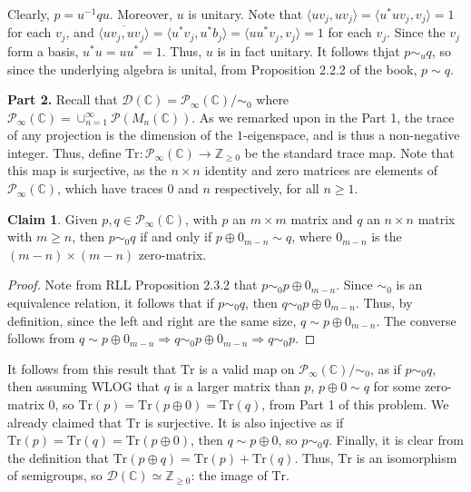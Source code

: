 \documentclass[aps,pra,showpacs,notitlepage,onecolumn,superscriptaddress,nofootinbib]{revtex4-1}
\theoremstyle{definition}
\newtheorem{claim}{Claim}[section]
\begin{document}
Clearly, $p = u^{-1} q u$. Moreover, $u$ is unitary. Note that $\langle u v_j, u v_j \rangle = \langle u^{*} u v_j, v_j \rangle = 1$ for each $v_j$, and $\overline{\langle u v_j, u v_j \rangle} = \langle u^{*} v_j, u^{*} b_j \rangle = \langle u u^{*} v_j, v_j \rangle = 1$
for each $v_j$. Since the $v_j$ form a basis, $u^{*} u = u u^{*} = 1$. Thus, $u$ is in fact unitary. It follows thjat $p \sim_{u} q$, so since the underlying algebra is unital, from Proposition 2.2.2 of the book, $p \sim q$.
\newline

\noindent \textbf{Part 2.} Recall that $\mathcal{D}(\mathbb{C}) = \mathcal{P}_{\infty}(\mathbb{C}) / \sim_0$ where $\mathcal{P}_{\infty}(\mathbb{C}) = \cup_{n = 1}^{\infty} \mathcal{P}(M_n(\mathbb{C}))$.
As we remarked upon in the Part 1, the trace of any projection is the dimension of the $1$-eigenspace, and is thus a non-negative integer. Thus, define $\text{Tr} : \mathcal{P}_{\infty}(\mathbb{C}) \rightarrow \mathbb{Z}_{\geq 0}$
be the standard trace map. Note that this map is surjective, as the $n \times n$ identity and zero matrices are elements of $\mathcal{P}_{\infty}(\mathbb{C})$, which have traces $0$ and $n$ respectively, for all $n \geq 1$.

\begin{claim}
  Given $p, q \in \mathcal{P}_{\infty}(\mathbb{C})$, with $p$ an $m \times m$ matrix and $q$ an $n \times n$ matrix with $m \geq n$, then $p \sim_0 q$ if and only if
  $p \oplus 0_{m - n} \sim q$, where $0_{m - n}$ is the $(m - n) \times (m - n)$ zero-matrix.
  \end{claim}

\begin{proof}
  Note from RLL Proposition 2.3.2 that $p \sim_0 p \oplus 0_{m - n}$. Since $\sim_0$ is an equivalence relation, it follows that if $p \sim_0 q$, then $q \sim_0 p \oplus 0_{m - n}$. Thus, by definition,
  since the left and right are the same size, $q \sim p \oplus 0_{m - n}$. The converse follows from $q \sim p \oplus 0_{m - n} \Rightarrow q \sim_0 p \oplus 0_{m - n} \Rightarrow q \sim_0 p$.
\end{proof}

\noindent It follows from this result that $\text{Tr}$ is a valid map on $\mathcal{P}_{\infty}(\mathbb{C}) / \sim_0$, as if $p \sim_0 q$, then assuming WLOG that $q$ is a larger matrix than $p$, $p \oplus 0 \sim q$
for some zero-matrix $0$, so $\text{Tr}(p) = \text{Tr}(p \oplus 0) = \text{Tr}(q)$, from Part 1 of this problem. We already claimed that $\text{Tr}$ is surjective. It is also injective as if $\text{Tr}(p) = \text{Tr}(q) = \text{Tr}(p \oplus 0)$, then $q \sim p \oplus 0$, so $p \sim_0 q$. Finally, it is clear from the definition that $\text{Tr}(p \oplus q) = \text{Tr}(p) + \text{Tr}(q)$. Thus, $\text{Tr}$ is an isomorphism of semigroups, so $\mathcal{D}(\mathbb{C}) \simeq \mathbb{Z}_{\geq 0}$: the image of $\text{Tr}$.
\newline
\end{document}
